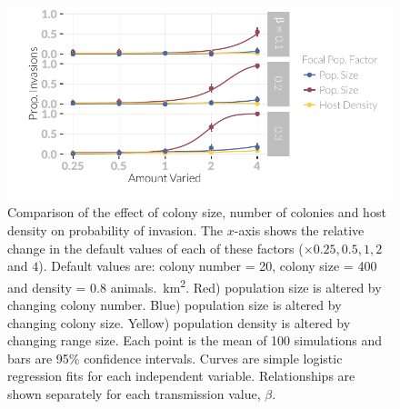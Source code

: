 \begin{knitrout}\footnotesize
{}\color{fgcolor}\begin{figure}[t]

{\centering \includegraphics[width=\textwidth]{figure/plotValueChangeMeans-1} 

}

\caption[Comparison of the effect of colony size, number of colonies and host density on probability of invasion.]{
Comparison of the effect of colony size, number of colonies and host density on probability of invasion.
The $x$-axis shows the relative change in the default values of each of these factors ($\times 0.25, 0.5, 1, 2$ and $4$).
Default values are: colony number = 20, colony size = 400 and density = 0.8 animals.\si{\per\square\kilo\metre}.
Red) population size is altered by changing colony number.
Blue) population size is altered by changing colony size.
Yellow) population density is altered by changing range size.
Each point is the mean of 100 simulations and bars are 95\% confidence intervals.
Curves are simple logistic regression fits for each independent variable.
Relationships are shown separately for each transmission value, $\beta$.
}\label{fig:plotValueChangeMeans}
\end{figure}


\end{knitrout}







